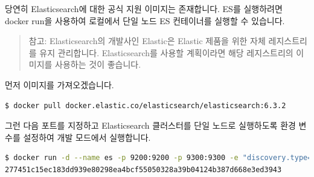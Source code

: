 당연히 Elasticsearch에 대한 공식 지원 이미지는 존재합니다. ES를 실행하려면 docker run을 사용하여 로컬에서 단일 노드 ES 컨테이너를 실행할 수 있습니다.
\begin{quote}
참고: Elasticsearch의 개발사인 Elastic은 Elastic 제품을 위한 자체 레지스트리를 유지 관리합니다. Elasticsearch를 사용할 계획이라면 해당 레지스트리의 이미지를 사용하는 것이 좋습니다.
\end{quote}
먼저 이미지를 가져오겠습니다.
\begin{lstlisting}[language=bash]
$ docker pull docker.elastic.co/elasticsearch/elasticsearch:6.3.2
\end{lstlisting}

그런 다음 포트를 지정하고 Elasticsearch 클러스터를 단일 노드로 실행하도록 환경 변수를 설정하여 개발 모드에서 실행합니다.
\begin{lstlisting}[language=bash]
$ docker run -d --name es -p 9200:9200 -p 9300:9300 -e "discovery.type=single-node" docker.elastic.co/elasticsearch/elasticsearch:6.3.2
277451c15ec183dd939e80298ea4bcf55050328a39b04124b387d668e3ed3943
\end{lstlisting}

